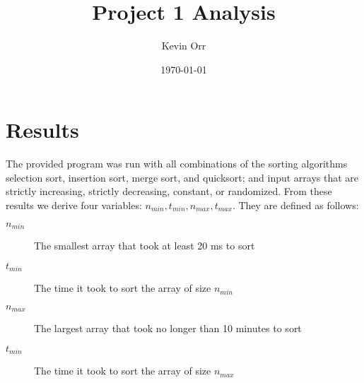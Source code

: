 \documentclass[11pt]{article}
\author{Kevin Orr}
\date{\today}
\title{Project 1 Analysis}
\begin{document}
\maketitle
\tableofcontents


\section{Results}
\label{sec:orgcc3118e}

The provided program was run with all combinations of the sorting algorithms selection sort,
insertion sort, merge sort, and quicksort; and input arrays that are strictly increasing, strictly
decreasing, constant, or randomized. From these results we derive four variables:
\(n_{min}, t_{min}, n_{max}, t_{max}\). They are defined as follows:

\begin{description}
\item[$n_{min}$] The smallest array that took at least 20 ms to sort
\item[$t_{min}$] The time it took to sort the array of size $n_{min}$
\item[$n_{max}$] The largest array that took no longer than 10 minutes to sort
\item[$t_{min}$] The time it took to sort the array of size $n_{max}$
\end{description}
\end{document}

